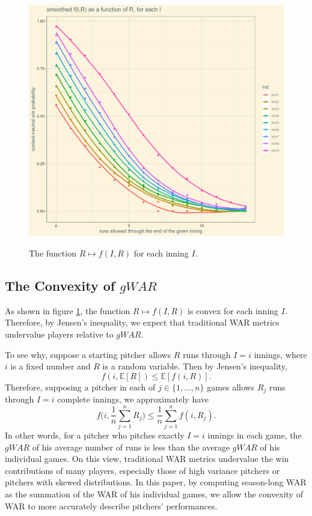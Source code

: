 \documentclass[12pt]{article}
\newcommand{\E}{{\mathbb E}}
\begin{document}
\begin{figure}[t!]
\centering
\caption{The function $R \mapsto f(I,R)$ for each inning $I$.} 
\includegraphics[width=15cm]{../writeup_plots/plot_fIR_R_smoothed.png}
\label{fig:fR}
\end{figure}

\subsection{The Convexity of $gWAR$}\label{sec:convexityOfWAR}

As shown in figure \ref{fig:fR}, the function $R \mapsto f(I,R)$ is convex for each inning $I$. Therefore, by Jensen's inequality, we expect that traditional WAR metrics undervalue players relative to $gWAR$. 

To see why, suppose a starting pitcher allows $R$ runs through $I = i$ innings, where $i$ is a fixed number and $R$ is a random variable. Then by Jensen's inequality, 
\begin{equation}
f(i, \E[R]) \leq \E[f(i,R)].
\label{eqn:jensen1}
\end{equation}
Therefore, supposing a pitcher in each of $j \in \{1,...,n\}$ games allows $R_j$ runs through $I=i$ complete innings, we approximately have
\begin{equation}
f\bigg(i, \frac{1}{n}\sum_{j=1}^{n} R_j\bigg) \leq \frac{1}{n}\sum_{j=1}^{n} f(i,R_j).
\label{eqn:jensen2}
\end{equation}
In other words, for a pitcher who pitches exactly $I=i$ innings in each game, the $gWAR$ of his average number of runs is less than the average $gWAR$ of his individual games. On this view, traditional WAR metrics undervalue the win contributions of many players, especially those of high variance pitchers or pitchers with skewed distributions. In this paper, by computing season-long WAR as the summation of the WAR of his individual games, we allow the convexity of WAR to more accurately describe pitchers' performances. 
\end{document}

